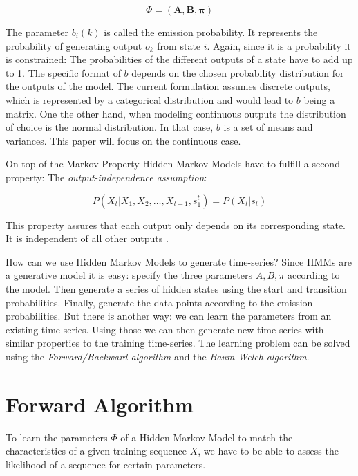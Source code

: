 \begin{equation}
\Phi=(\mathbf{A}, \mathbf{B}, \boldsymbol{\pi})
\end{equation}

The parameter $b_{i}(k)$ is called the emission probability. It represents the probability of generating output $o_k$ from state $i$. Again, since it is a probability it is constrained: The probabilities of the different outputs of a state have to add up to 1. The specific format of $b$ depends on the chosen probability distribution for the outputs of the model. 
The current formulation assumes discrete outputs, which is represented by a categorical distribution and would lead to $b$ being a matrix. One the other hand, when modeling continuous outputs the distribution of choice is the normal distribution. In that case, $b$ is a set of means and variances. This paper will focus on the continuous case.

On top of the Markov Property Hidden Markov Models have to fulfill a second property: The \emph{output-independence assumption}:

\begin{equation}
P\left(X_{t} |X_{1}, X_{2}, \ldots, X_{t-1}, s_{1}^{t}\right)=P\left(X_{t} | s_{t}\right)
\end{equation}

This property assures that each output only depends on its corresponding state. It is independent of all other outputs \parencite{huang2001spoken}.

How can we use Hidden Markov Models to generate time-series? Since HMMs are a generative model it is easy: specify the three parameters $A, B, \pi$ according to the model. Then generate a series of hidden states using the start and transition probabilities. Finally, generate the data points according to the emission probabilities. But there is another way: we can learn the parameters from an existing time-series. Using those we can then generate new time-series with similar properties to the training time-series. The learning problem can be solved using the \emph{Forward/Backward algorithm} and the \emph{Baum-Welch algorithm}.

\section{Forward Algorithm}

To learn the parameters $\Phi$ of a Hidden Markov Model to match the characteristics of a given training sequence $X$, we have to be able to assess the likelihood of a sequence for certain parameters. 

